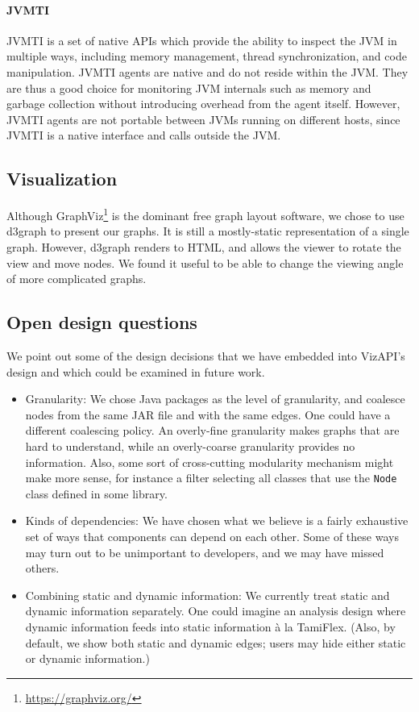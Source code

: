\paragraph{JVMTI}
JVMTI is a set of native APIs which provide the ability to inspect the JVM in multiple ways, including memory management, 
thread synchronization, and code manipulation.
JVMTI agents are native and do not reside within the JVM. 
They are thus a good choice for monitoring JVM internals such as memory and garbage collection without introducing overhead from the agent itself.
However, JVMTI agents are not portable between JVMs running on different hosts, since JVMTI is a native interface and calls outside the JVM.

\subsection{Visualization}
Although GraphViz\footnote{\url{https://graphviz.org/}} is the dominant
free graph layout software, we chose to use d3graph to present our graphs.
It is still a mostly-static representation of a single graph. However,
d3graph renders to HTML, and allows the viewer to rotate the view
and move nodes. We found it useful to be able
to change the viewing angle of more complicated graphs.

\subsection{Open design questions}
We point out some of the design decisions that we have embedded into VizAPI's
design and which could be examined in future work.
\begin{itemize}
\item Granularity: We chose Java packages as the level of granularity, and coalesce nodes from the same JAR file and with the same edges. One could have a different coalescing policy. An overly-fine granularity makes graphs that are hard to understand, while an overly-coarse granularity provides no information. Also, some sort of cross-cutting modularity mechanism might make more sense, for instance a filter selecting all classes that use the \texttt{Node} class defined in some library.
\item Kinds of dependencies: We have chosen what we believe is a fairly exhaustive set of ways that components can depend on each other. Some of these ways may turn out to be unimportant to developers, and we may have missed others.
\item Combining static and dynamic information: We currently treat static and dynamic information separately. One could imagine an analysis design where dynamic information feeds into static information à la TamiFlex. (Also, by default, we show both static and dynamic edges; users may hide either static or dynamic information.)
\end{itemize}
